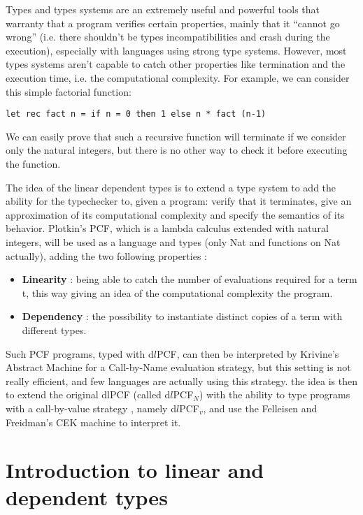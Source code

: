 \documentclass[a4paper,12pt]{article}
\begin{document}
Types and types systems are an extremely useful and powerful tools
that warranty that a program verifies certain properties, mainly that
it ``cannot go wrong'' (i.e. there shouldn't be types
incompatibilities and crash during the execution), especially with
languages using strong type systems. However, most types systems
aren't capable to catch other properties like termination and the
execution time, i.e. the computational complexity. For example, we can
consider this simple factorial function:

\begin{verbatim}
let rec fact n = if n = 0 then 1 else n * fact (n-1)
\end{verbatim}

We can easily prove that such a recursive function will terminate if we consider
only the natural integers, but there is no other way to check it before
executing the function.

The idea of the linear dependent types \cite{ldtrc} is to extend a type system
to add the ability for the typechecker to, given a program: verify that it
terminates, give an approximation of its computational complexity and specify
the semantics of its behavior. Plotkin's PCF, which is a lambda calculus
extended with natural integers, will be used as a language and types (only Nat
and functions on Nat actually), adding the two following properties :

\begin{itemize}
\item \textbf{Linearity} : being able to catch the number of evaluations required
  for a term t, this way giving an idea of the computational complexity the
  program.
\item \textbf{Dependency} : the possibility to instantiate distinct copies of a term with
  different types.
\end{itemize}

Such PCF programs, typed with d$l$PCF, can then be interpreted by Krivine's
Abstract Machine for a Call-by-Name evaluation strategy, but this setting is not
really efficient, and few languages are actually using this strategy. the idea
is then to extend the original dlPCF (called d$l$PCF$_{N} $) with the ability to
type programs with a call-by-value strategy \cite{ldtcbv}, namely d$l$PCF$_{v} $,
  and use the Felleisen and Freidman's CEK machine to interpret it.

\section{Introduction to linear and dependent types}
\end{document}
